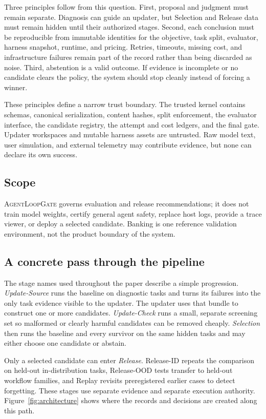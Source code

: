 \documentclass[10pt,twocolumn]{article}
\newcommand{\system}{\textsc{AgentLoopGate}\xspace}
\begin{document}
Three principles follow from this question. First, proposal and judgment must
remain separate. Diagnosis can guide an updater, but Selection and Release data
must remain hidden until their authorized stages. Second, each conclusion must
be reproducible from immutable identities for the objective, task split,
evaluator, harness snapshot, runtime, and pricing. Retries, timeouts, missing
cost, and infrastructure failures remain part of the record rather than being
discarded as noise. Third, abstention is a valid outcome. If evidence is
incomplete or no candidate clears the policy, the system should stop cleanly
instead of forcing a winner.

These principles define a narrow trust boundary. The trusted kernel contains
schemas, canonical serialization, content hashes, split enforcement, the
evaluator interface, the candidate registry, the attempt and cost ledgers, and
the final gate. Updater workspaces and mutable harness assets are untrusted.
Raw model text, user simulation, and external telemetry may contribute
evidence, but none can declare its own success.

\subsection{Scope}

\system governs evaluation and release recommendations; it does not train
model weights, certify general agent safety, replace host logs, provide a trace
viewer, or deploy a selected candidate. Banking is one reference validation
environment, not the product boundary of the system.

\subsection{A concrete pass through the pipeline}

The stage names used throughout the paper describe a simple progression.
\emph{Update-Source} runs the baseline on diagnostic tasks and turns its
failures into the only task evidence visible to the updater. The updater uses
that bundle to construct one or more candidates. \emph{Update-Check} runs a
small, separate screening set so malformed or clearly harmful candidates can
be removed cheaply. \emph{Selection} then runs the baseline and every survivor
on the same hidden tasks and may either choose one candidate or abstain.

Only a selected candidate can enter \emph{Release}. Release-ID repeats the
comparison on held-out in-distribution tasks, Release-OOD tests transfer to
held-out workflow families, and Replay revisits preregistered earlier cases to
detect forgetting. These stages use separate evidence and separate execution
authority. Figure~\ref{fig:architecture} shows where the records and decisions
are created along this path.
\end{document}
